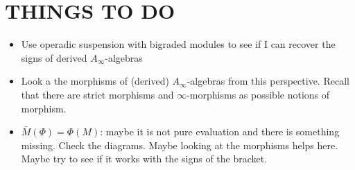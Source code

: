 \documentclass[twoside]{article}
\begin{document}
\section{THINGS TO DO}

\begin{itemize}
\item Use operadic suspension with bigraded modules to see if I can recover the signs of derived $A_\infty$-algebras
\item Look a the morphisms of (derived) $A_\infty$-algebras from this perspective. Recall that there are strict morphisms and $\infty$-morphisms as possible notions of morphism.
\item $\bar{M}(\Phi)=\Phi(M)$: maybe it is not pure evaluation and there is something missing. Check the diagrams. Maybe looking at the morphisms helps here. Maybe try to see if it works with the signs of the bracket.
\end{itemize}
\end{document}
